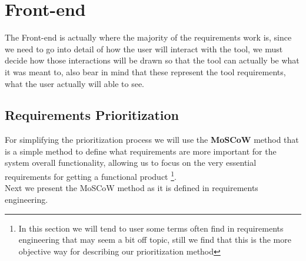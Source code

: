 
\section{Front-end}
\label{sec:frontend}

The Front-end is actually where the majority of the requirements work is, since we need to go into detail of how the user will interact with the tool, we must decide how those interactions will be drawn so that the tool can actually be what it was meant to, also bear in mind that these represent the tool requirements, what the user actually will able to see.

\subsection{Requirements Prioritization}
For simplifying the prioritization process we will use the \textbf{MoSCoW} method that is a simple method to define what requirements are more important for the system overall functionality, allowing us to focus on the very essential requirements for getting a functional product \footnote{In this section we will tend to user some terms often find in requirements engineering that may seem a bit off topic, still we find that this is the more objective way for describing our prioritization method}.\\
\indent Next we present the MoSCoW method as it is defined in requirements engineering.

